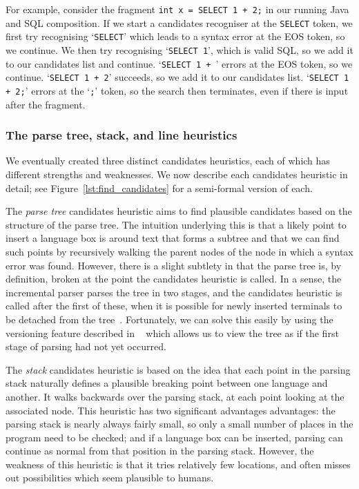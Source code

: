 \documentclass[sigplan,screen]{acmart}\settopmatter{printfolios=true,printccs=false,printacmref=false}
\begin{document}
For example, consider the fragment \texttt{int x = SELECT 1 + 2;} in our
running Java and SQL composition. If we start a candidates recogniser at the
\texttt{SELECT} token, we first try recognising `\texttt{SELECT}' which leads
to a syntax error at the EOS token, so we continue. We then try recognising
`\texttt{SELECT 1}', which is valid SQL, so we add it to our candidates list
and continue. `\texttt{SELECT 1 + }' errors at the EOS token, so we continue.
`\texttt{SELECT 1 + 2}' succeeds, so we add it to our candidates list.
`\texttt{SELECT 1 + 2;}' errors at the `\texttt{;}' token, so the search then
terminates, even if there is input after the fragment.


\subsubsection{The parse tree, stack, and line heuristics}

We eventually created three distinct candidates heuristics, each of which has
different strengths and weaknesses. We now describe each candidates heuristic
in detail; see Figure~\ref{lst:find_candidates} for a semi-formal version of
each.

The \emph{parse tree} candidates heuristic aims to
find plausible candidates based on the structure of the parse tree. The
intuition underlying this is that a likely point to insert a language box is
around text that forms a subtree and that we can find such points by
recursively walking the parent nodes of the node in which a syntax error was
found. However, there is a slight subtlety in that the parse tree is, by
definition, broken at the point the candidates heuristic is called. In a sense,
the incremental parser parses the tree in two stages, and the candidates
heuristic is called after the first of these, when it is possible for newly
inserted terminals to be detached from the tree~\cite[p.~58, 60]{wagner98practicalalgorithms}. Fortunately, we can solve this
easily by using the versioning feature described in ~\citet[p.~15]{wagner98practicalalgorithms}
which allows
us to view the tree as if the first stage of parsing had not yet occurred.

The \emph{stack} candidates heuristic is based on
the idea that each point in the parsing stack naturally defines a plausible
breaking point between one language and another. It walks backwards over the
parsing stack, at each point looking at the associated node. This heuristic has
two significant advantages
advantages: the parsing stack is nearly always fairly small, so only a small number
of places in the program need to be checked; and if a language box can be
inserted, parsing can continue as normal from that position in the parsing
stack. However, the weakness of this heuristic is that it tries relatively few
locations, and often misses out possibilities which seem plausible to humans.
\end{document}
